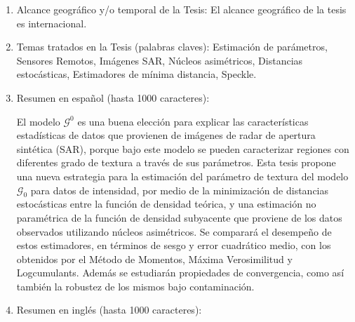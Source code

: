 \begin{enumerate}
	\item Alcance geográfico y/o temporal de la Tesis: El alcance geográfico de la tesis es internacional.

	\item Temas tratados en la Tesis (palabras claves): Estimación de parámetros, Sensores Remotos, Imágenes SAR, Núcleos asimétricos, Distancias estocásticas, Estimadores de mínima distancia, Speckle.

	\item Resumen en español (hasta 1000 caracteres): 
	
	El modelo $\mathcal{G}^0$ es una buena elección para explicar las características estadísticas de datos que provienen de imágenes de radar de apertura sintética (SAR), porque bajo este modelo se pueden caracterizar regiones con diferentes grado de textura a través de sus parámetros.  Esta tesis propone una nueva estrategia para la estimación del parámetro de textura del modelo $\mathcal G_0$ para datos de intensidad, por medio de la minimización de distancias estocásticas entre la función de densidad teórica, y una estimación no paramétrica de la función de densidad subyacente que proviene de los datos observados utilizando núcleos asimétricos. Se comparará el desempeño de estos estimadores, en términos de sesgo y error cuadrático medio, con los obtenidos por el Método de Momentos, Máxima Verosimilitud y Logcumulants. Además se estudiarán propiedades de convergencia, como así también la robustez de los mismos bajo contaminación. 

%
%
%
	\item Resumen en inglés (hasta 1000 caracteres):
	

\end{enumerate}
